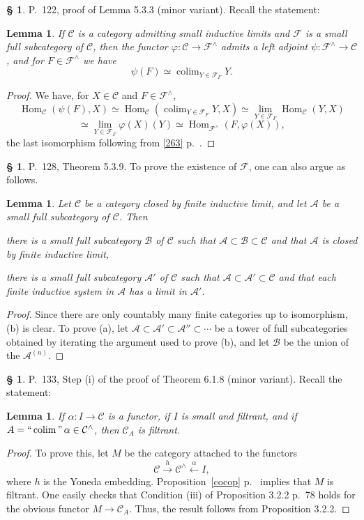 \documentclass[12pt]{article}
\newtheorem{lem}[thm]{Lemma}
\theoremstyle{remark}
\theoremstyle{definition}
\newtheorem{s}[thm]{\S}
\newcommand{\A}{\mathcal A}
\newcommand{\B}{\mathcal B}
\newcommand{\C}{\mathcal C}
\newcommand{\F}{\mathcal F}
\newcommand{\mv}{ (minor variant)}
\DeclareMathOperator*{\coli}{colim}
\DeclareMathOperator*{\co}{colim}
\DeclareMathOperator*{\ic}{``\coli"}
\DeclareMathOperator{\Hom}{Hom}%
\begin{document}
%
%
\begin{s} 
P.~122, proof of Lemma 5.3.3\mv. Recall the statement: 
%
\begin{lem}
If $\C$ is a category admitting small inductive limits and $\F$ is a small full subcategory of $\C$, then the functor $\varphi:\C\to\F^\wedge$ admits a left adjoint $\psi:\F^\wedge\to\C$, and for $F\in\F^\wedge$ we have 
$$
\psi(F)\simeq\co_{Y\in\F_F}Y. 
$$ 
\end{lem} 
%
\begin{proof}
We have, for $X\in\C$ and $F\in\F^\wedge$, 
$$
\Hom_\C(\psi(F),X)\simeq\Hom_\C\left(\co_{Y\in\F_F}Y,X\right)\simeq\lim_{Y\in\F_F}\Hom_\C(Y,X)
$$ 
$$
\simeq\lim_{Y\in\F_F}\varphi(X)(Y)\simeq\Hom_{\F^\wedge}(F,\varphi(X)),
$$ 
the last isomorphism following from \eqref{263} p.~\pageref{263}.
\end{proof}
\end{s}
%
%
\begin{s} 
P.~128, Theorem 5.3.9. To prove the existence of $\F$, one can also argue as follows. 
%
\begin{lem} 
%
Let $\C$ be a category closed by finite inductive limit, and let $\A$ be a small full subcategory of $\C$. Then 

 there is a small full subcategory $\B$ of $\C$ such that $\A\subset\B\subset \C$ and that $\A$ is closed by finite inductive limit, 

 there is a small full subcategory $\A'$ of $\C$ such that $\A\subset\A'\subset \C$ and that each finite inductive system in $\A$ has a limit in $\A'$. 
%
\end{lem} 
%
\begin{proof}
Since there are only countably many finite categories up to isomorphism, (b) is clear. To prove (a), let $\A\subset\A'\subset\A''\subset\cdots$ be a tower of full subcategories obtained by iterating the argument used to prove (b), and let $\B$ be the union of the $\A^{(n)}$.
\end{proof}
\end{s}
%
%
\begin{s} 
P.~133, Step (i) of the proof of Theorem 6.1.8\mv. Recall the statement: 
%
\begin{lem} 
If $\alpha:I\to\C$ is a functor, if $I$ is small and filtrant, and if $A=\ic\alpha\in\C^\wedge$, then $\C_A$ is filtrant. 
\end{lem} 
%
\begin{proof}
To prove this, let $M$ be the category attached to the functors 
$$
\C\xrightarrow h\C^\wedge\xleftarrow\alpha I,
$$ 
where $h$ is the Yoneda embedding. Proposition~\ref{cocop} p.~\pageref{cocop} implies that $M$ is filtrant. One easily checks that Condition (iii) of Proposition 3.2.2 p.~78 holds for the obvious functor $M\to\C_A$. Thus, the result follows from Proposition 3.2.2.
\end{proof}
\end{s}
\end{document}
